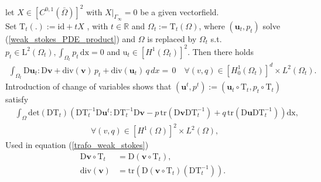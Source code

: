 \begin{proof*}
let $X \in [C^{0,1}(\bar{\Omega})]^2$ with $X \rvert_{\Gamma_{\infty}} = 0$ be a given vectorfield. \\
Set $\mathrm{T}_t(.) := \mathrm{id} + tX $ , with $t \in \mathbb{R}$ and $\Omega_t := \mathrm{T}_t(\Omega)$, where 
$(\mathbf{u}_t, p_t)$ solve (\ref{weak_stokes_PDE_product}) and $\Omega$ is replaced by $\Omega_t$ s.t. \\
$p_t \in \mathrm{L}^2(\Omega_t), \int_{\Omega_t} p_t \, \mathrm{dx} = 0 $ and $\mathrm{u}_t \in [H^1(\Omega_t)]^2$. Then there holds 
\begin{align}
	\int_{\Omega_t} \mathrm{D} \mathbf{u}_t : \mathrm{D} \mathbf{\mathbf{v}} + \mathrm{div}(\mathbf{v}) \, p_t + \mathrm{div}(\mathbf{u}_t) \, q \, dx = \, 0 \quad \forall (v,q)
    \in  [H^1_0(\Omega_t)]^d \times L^2(\Omega_t).
\end{align}
Introduction of change of variables shows that $(\mathbf{u}^t, p^t) := (\mathbf{u}_t \circ \mathrm{T}_t, p_t \circ \mathrm{T}_t)$ satisfy
\begin{equation}
\begin{aligned}\label{trafo_weak_stokes}
	&\int_\Omega \mathrm{det}(\mathrm{DT}_t)
	\left( \mathrm{DT}_t^{-1} \mathrm{D}\mathbf{u}^t:\mathrm{DT}_t^{-1} \mathrm{D}\mathbf{v} -p\, \mathrm{tr}(\mathrm{D}\mathbf{v}\mathrm{DT}_t^{-1})  +
	q \, \mathrm{tr}(\mathrm{D}\mathbf{u}\mathrm{DT}_t^{-1}) \right) \mathrm{dx}, \\
	& \quad \quad \quad \quad \quad \quad \quad \quad \quad \ \forall (v,q) \in [H^1(\Omega)]^2 \times L^2(\Omega),
\end{aligned}
\end{equation}
Used in equation (\ref{trafo_weak_stokes})
\begin{align*}
	\mathrm{D}\mathbf{v}\circ\mathrm{T}_t &= \mathrm{D}(\mathbf{v}\circ\mathrm{T}_t), \\
	\mathrm{div}(\mathbf{v}) &= \mathrm{tr} \left( \mathrm{D}(\mathbf{v} \circ \mathrm{T}_t)(\mathrm{DT}_t^{-1}) \right).
\end{align*}

\vfill

\pagebreak


\end{proof*}
